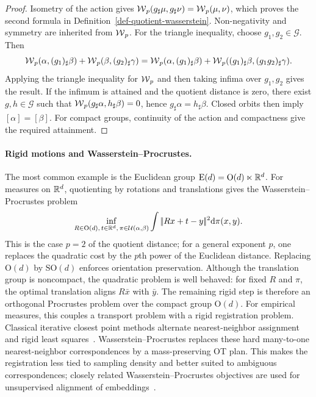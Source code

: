 \begin{proof}
	Isometry of the action gives $\operatorname{\mathcal{W}}_p(g_\sharp\mu,g_\sharp\nu)=\operatorname{\mathcal{W}}_p(\mu,\nu)$, which proves the second formula in Definition~\ref{def-quotient-wasserstein}. Non-negativity and symmetry are inherited from $\operatorname{\mathcal{W}}_p$. For the triangle inequality, choose $g_1,g_2\in\mathcal G$. Then
	\[
		\operatorname{\mathcal{W}}_p(\alpha,(g_1)_\sharp\beta)
		+
		\operatorname{\mathcal{W}}_p(\beta,(g_2)_\sharp\gamma)
		=
		\operatorname{\mathcal{W}}_p(\alpha,(g_1)_\sharp\beta)
		+
		\operatorname{\mathcal{W}}_p((g_1)_\sharp\beta,(g_1g_2)_\sharp\gamma).
	\]
	Applying the triangle inequality for $\operatorname{\mathcal{W}}_p$ and then taking infima over $g_1,g_2$ gives the result. If the infimum is attained and the quotient distance is zero, there exist $g,h\in\mathcal G$ such that $\operatorname{\mathcal{W}}_p(g_\sharp\alpha,h_\sharp\beta)=0$, hence $g_\sharp\alpha=h_\sharp\beta$. Closed orbits then imply $[\alpha]=[\beta]$. For compact groups, continuity of the action and compactness give the required attainment.
\end{proof}

\paragraph{Rigid motions and Wasserstein--Procrustes.}

The most common example is the Euclidean group $\mathrm E(d)=\mathrm O(d)\ltimes\mathbb{R}^d$. For measures on $\mathbb{R}^d$, quotienting by rotations and translations gives the Wasserstein--Procrustes problem
\[
	\inf_{R\in\mathrm O(d),\,t\in\mathbb{R}^d,\,\pi\in\mathcal{U}(\alpha,\beta)}
	\int|\!| Rx+t-y |\!|^2\mathrm{d}\pi(x,y).
\]
This is the case $p=2$ of the quotient distance; for a general exponent $p$, one replaces the quadratic cost by the $p$th power of the Euclidean distance. Replacing $\mathrm O(d)$ by $\mathrm{SO}(d)$ enforces orientation preservation. Although the translation group is noncompact, the quadratic problem is well behaved: for fixed $R$ and $\pi$, the optimal translation aligns $R\bar x$ with $\bar y$. The remaining rigid step is therefore an orthogonal Procrustes problem over the compact group $\mathrm O(d)$.
For empirical measures, this couples a transport problem with a rigid registration problem. Classical iterative closest point methods alternate nearest-neighbor assignment and rigid least squares~\cite{BeslMcKay1992ICP}. Wasserstein--Procrustes replaces these hard many-to-one nearest-neighbor correspondences by a mass-preserving OT plan. This makes the registration less tied to sampling density and better suited to ambiguous correspondences; closely related Wasserstein--Procrustes objectives are used for unsupervised alignment of embeddings~\cite{grave2018unsupervised}.

